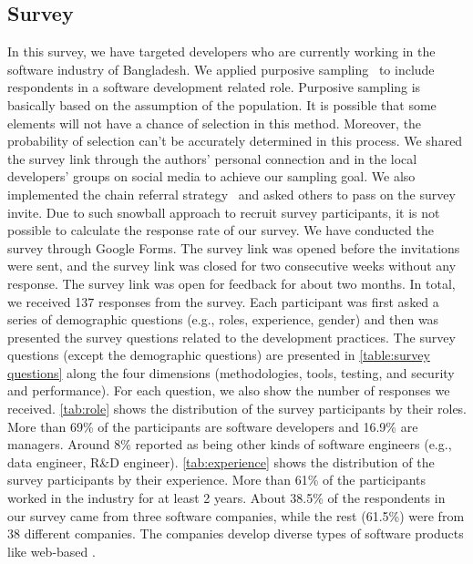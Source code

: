 \subsection{Survey}
\label{survey_participants}
In this survey, we have targeted developers who are currently working in the
software industry of Bangladesh. We applied purposive sampling~\cite{Vogt2005} to
include respondents in a software development related role. Purposive sampling
is basically based on the assumption of the population. It is possible that some
elements will not have a chance of selection in this method. Moreover, the
probability of selection can't be accurately determined in this process. We
shared the survey link through the authors' personal connection and in the local
developers' groups on social media to achieve our sampling goal. We also
implemented the chain referral strategy~\cite{creswell2013} and asked others to
pass on the survey invite. Due to such snowball approach to recruit survey participants, it is not possible to calculate the
response rate of our survey. We have conducted the survey through Google Forms. The survey link was opened
before the invitations were sent, and the survey link was closed for two
consecutive weeks without any response. The survey link was open for feedback
for about two months. In total, we
received 137 responses from the survey. Each participant was first asked a series of demographic questions (e.g., roles, experience, gender) and 
then was presented the survey questions related to the development practices. The survey questions (except the demographic questions) 
are presented in \tbl\ref{table:survey questions} along the four 
dimensions (methodologies, tools, testing, and security and performance). For each question, we also show the number of responses we received. 
\tbl\ref{tab:role} shows the distribution of the survey participants by their roles. More than 69\% of the participants 
are software developers and 16.9\% are managers. Around 8\% reported as being other kinds of software engineers (e.g., data engineer, R\&D engineer). 
\tbl\ref{tab:experience} shows the distribution of the survey participants by their experience. More than 61\% of the participants worked in the
industry for at least 2 years. About 38.5\% of the respondents in our survey came from three software companies, while the rest (61.5\%) were from 38 
different companies. The companies develop diverse types of software products like web-based . 



